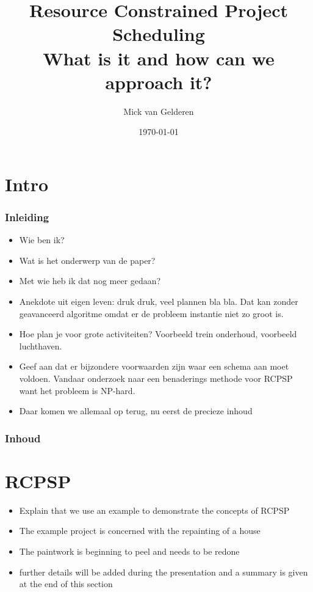 \documentclass{beamer}
\title[RCPS]{Resource Constrained Project Scheduling\\
What is it and how can we approach it?}
\author{Mick van Gelderen}
\institute{TU Delft}
\date{\today}
\theoremstyle{definition}
\begin{document}
\begin{frame}
\titlepage
\end{frame}

\section*{Intro}
\begin{frame}
    \frametitle{Inleiding}
    \begin{itemize}
        \item Wie ben ik?
        \item Wat is het onderwerp van de paper?
        \item Met wie heb ik dat nog meer gedaan?
        \item Anekdote uit eigen leven: druk druk, veel plannen bla bla. Dat kan zonder geavanceerd algoritme omdat er de probleem instantie niet zo groot is. 
        \item Hoe plan je voor grote activiteiten? Voorbeeld trein onderhoud, voorbeeld luchthaven. 
        \item Geef aan dat er bijzondere voorwaarden zijn waar een schema aan moet voldoen.  Vandaar onderzoek naar een benaderings methode voor  RCPSP want het probleem is NP-hard. 
        \item Daar komen we allemaal op terug, nu eerst de precieze inhoud
    \end{itemize}
\end{frame}

\begin{frame}
    \frametitle{Inhoud}
    \tableofcontents
\end{frame}

\section{RCPSP}


\begin{frame}
	\begin{itemize}
		\item Explain that we use an example to demonstrate the concepts of RCPSP
		\item The example project is concerned with the repainting of a house
		\item The paintwork is beginning to peel and needs to be redone
		\item further details will be added during the presentation and a summary is given at the end of this section
	\end{itemize}
\end{frame}
\end{document}
